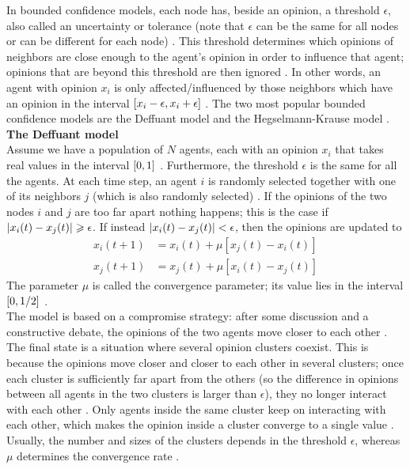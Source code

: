 \documentclass[11 pt , letterpaper , twoside , openright]{book}
\begin{document}
In bounded confidence models, each node has, beside an opinion, a threshold $\epsilon$, also called an uncertainty or tolerance (note that $\epsilon$ can be the same for all nodes or can be different for each node) \cite{Castellano2009}\cite{Deffuant2006}. This threshold determines which opinions of neighbors are close enough to the agent's opinion in order to influence that agent; opinions that are beyond this threshold are then ignored \cite{Deffuant2006}. In other words, an agent with opinion $x_i$ is only affected/influenced by those neighbors which have an opinion in the interval $\interval{x_i-\epsilon}{x_i+\epsilon}$ \cite{Castellano2009}. The two most popular bounded confidence models are the Deffuant model and the Hegselmann-Krause model \cite{Castellano2009}. \\
\newline
\textbf{The Deffuant model}\\
\newline
Assume we have a population of $N$ agents, each with an opinion $x_i$ that takes real values in the interval $\interval{0}{1}$ \cite{Castellano2009}. Furthermore, the threshold $\epsilon$ is the same for all the agents. At each time step, an agent $i$ is randomly selected together with one of its neighbors $j$ (which is also randomly selected) \cite{Castellano2009}. If the opinions of the two nodes $i$ and $j$ are too far apart nothing happens; this is the case if $\abs{x_i(t) - x_j(t)} \geqslant \epsilon$. If instead $\abs{x_i(t) - x_j(t)} < \epsilon$, then the opinions are updated to \cite{Castellano2009}
\begin{equation}
\begin{split}
	x_i(t+1) &= x_i(t) + \mu [x_j(t) - x_i(t)]\\
	x_j(t+1) &= x_j(t) + \mu [x_i(t) - x_j(t)]
\end{split}
\end{equation}
The parameter $\mu$ is called the convergence parameter; its value lies in the interval $\interval{0}{1/2}$ \cite{Castellano2009}. \\
The model is based on a compromise strategy: after some discussion and a constructive debate, the opinions of the two agents move closer to each other \cite{Castellano2009}. \\
The final state is a situation where several opinion clusters coexist. This is because the opinions move closer and closer to each other in several clusters; once each cluster is sufficiently far apart from the others (so the difference in opinions between all agents in the two clusters is larger than $\epsilon$), they no longer interact with each other \cite{Castellano2009}. Only agents inside the same cluster keep on interacting with each other, which makes the opinion inside a cluster converge to a single value \cite{Castellano2009}. Usually, the number and sizes of the clusters depends in the threshold $\epsilon$, whereas $\mu$ determines the convergence rate \cite{Castellano2009}.\\
\end{document}

